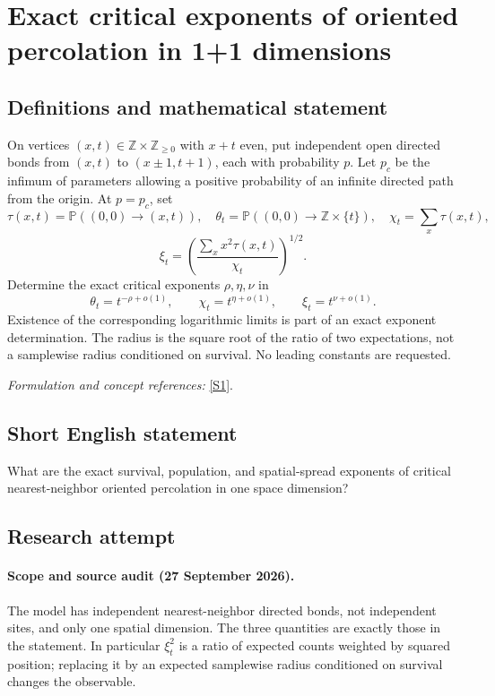 \documentclass[11pt]{article}
\begin{document}
\section*{\texorpdfstring{Exact critical exponents of oriented percolation in 1+1 dimensions}{Exact critical exponents of oriented percolation in 1+1 dimensions}}\label{457}
\subsection{Definitions and mathematical statement}
On vertices $(x,t)\in{\mathbb{Z}}\times{\mathbb{Z}}_{\ge0}$ with $x+t$ even, put independent open directed bonds from $(x,t)$ to $(x\pm1,t+1)$, each with probability $p$. Let $p_c$ be the infimum of parameters allowing a positive probability of an infinite directed path from the origin. At $p=p_c$, set
\[
 \tau(x,t)={\mathbb{P}}((0,0)\to(x,t)),\quad
 \theta_t={\mathbb{P}}((0,0)\to{\mathbb{Z}}\times\{t\}),\quad
 \chi_t=\sum_x\tau(x,t),
\]
\[
 \xi_t=\left(\frac{\sum_xx^2\tau(x,t)}{\chi_t}\right)^{1/2}.
\]
Determine the exact critical exponents $\rho,\eta,\nu$ in
\[
 \theta_t=t^{-\rho+o(1)},\qquad
 \chi_t=t^{\eta+o(1)},\qquad \xi_t=t^{\nu+o(1)}.
\]
Existence of the corresponding logarithmic limits is part of an exact exponent determination. The radius is the square root of the ratio of two expectations, not a samplewise radius conditioned on survival. No leading constants are requested.
\par\smallskip\textit{Formulation and concept references:} \href{https://arxiv.org/abs/1709.08291}{[S1]}.

\subsection{Short English statement}
What are the exact survival, population, and spatial-spread exponents of critical nearest-neighbor oriented percolation in one space dimension?
\subsection{Research attempt}
\paragraph{Scope and source audit (27 September 2026).}
The model has independent nearest-neighbor directed bonds, not independent
sites, and only one spatial dimension. The three quantities are exactly
those in the statement. In particular $\xi_t^2$ is a ratio of expected
counts weighted by squared position; replacing it by an expected samplewise
radius conditioned on survival changes the observable.
\end{document}
